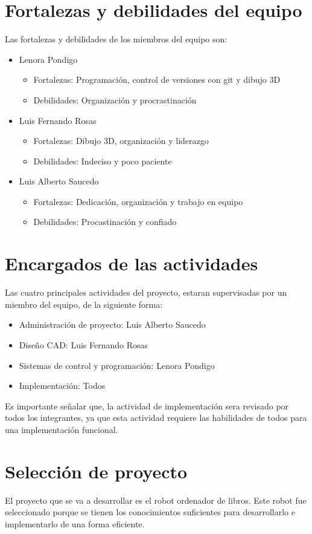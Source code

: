 \documentclass[12pt, a4paper]{article}
\begin{document}
\section{Fortalezas y debilidades del equipo}
Las fortalezas y debilidades de los miembros del equipo son:
\begin{itemize}
	\item Lenora Pondigo 
	\begin{itemize}
	    \item Fortalezas: Programaci\'on, control de versiones con git y dibujo 3D
	    \item Debilidades: Organizaci\'on y procrastinaci\'on
    \end{itemize}
    \item Luis Fernando Rosas 
	\begin{itemize}
	    \item Fortalezas: Dibujo 3D, organizaci\'on y liderazgo
	    \item Debilidades: Indeciso y poco paciente 
    \end{itemize}
    \item Luis Alberto Saucedo 
	\begin{itemize}
	    \item Fortalezas: Dedicaci\'on, organizaci\'on y trabajo en equipo
	    \item Debilidades: Procastinaci\'on y confiado
    \end{itemize}
\end{itemize}
\section{Encargados de las actividades}
Las cuatro principales actividades del proyecto, estaran supervisadas por un miembro del equipo, de la siguiente forma: 
\begin{itemize}
	\item Administraci\'on de proyecto: Luis Alberto Saucedo
	\item Diseño CAD: Luis Fernando Rosas
	\item Sistemas de control y programaci\'on: Lenora Pondigo
	\item Implementaci\'on: Todos
\end{itemize}
Es importante señalar que, la actividad de implementaci\'on sera revisado por todos los integrantes, ya que esta actividad requiere las habilidades de todos para una implementaci\'on funcional. 
\section{Selecci\'on de proyecto}
El proyecto que se va a desarrollar es el robot ordenador de libros. Este robot fue seleccionado porque se tienen los conocimientos suficientes para desarrollarlo e implementarlo de una forma eficiente.
\end{document}
